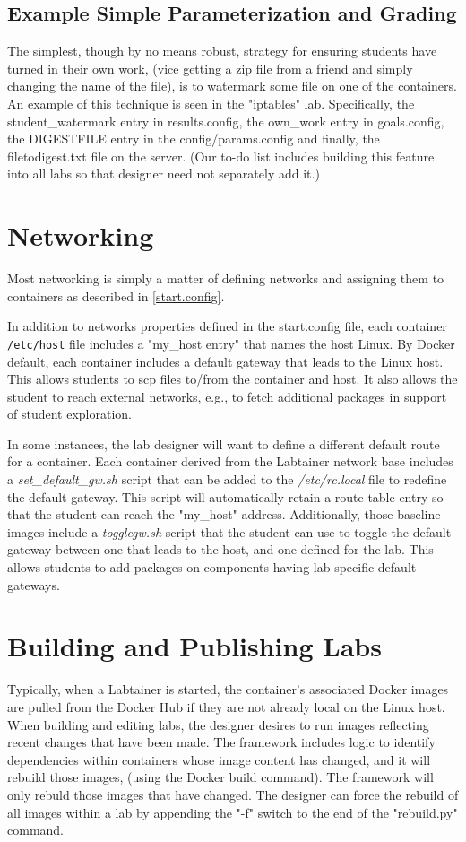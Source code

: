 \documentclass[12pt]{article}
\begin{document}
\subsection{Example Simple Parameterization and Grading}
The simplest, though by no means robust, strategy for ensuring students
have turned in their own work, (vice getting a zip file from a friend and simply
changing the name of the file), is to watermark some file on one of the containers.
An example of this technique is seen in the "iptables" lab.  Specifically, the
student\_watermark entry in results.config, the own\_work entry in goals.config,
the DIGESTFILE entry in the config/params.config and finally, the filetodigest.txt
file on the server.  (Our to-do list includes building this feature into all labs
so that designer need not separately add it.)

\section{Networking}
Most networking is simply a matter of defining networks and assigning them to containers
as described in \ref{start.config}.  

In addition to networks properties defined in the
start.config file, each container \texttt{/etc/host} file includes a "my\_host entry" that names
the host Linux.  By Docker default, each container includes a default gateway that
leads to the Linux host.  This allows students to scp files to/from the container and host.
It also allows the student to reach external networks, e.g., to fetch additional packages in
support of student exploration.

In some instances, the lab designer will want to define a different default route for a 
container.  Each container derived from the Labtainer network base includes a \textit{set\_default\_gw.sh}
script that can be added to the \textit{/etc/rc.local} file to redefine the default gateway.
This script will automatically retain a route table entry so that the student can reach the "my\_host"
address.  Additionally, those baseline images include a \textit{togglegw.sh} script that the student
can use to toggle the default gateway between one that leads to the host, and one defined for the lab.
This allows students to add packages on components having lab-specific default gateways.

\section{Building and Publishing Labs} \label{publishing}
Typically, when a Labtainer is started, the container's associated Docker images are pulled from
the Docker Hub if they are not already local on the Linux host.  When building and editing labs,
the designer desires to run images reflecting recent changes that have been made.  The framework
includes logic to identify dependencies within containers whose image content has changed, 
and it will rebuild those images, (using the Docker build command).  The framework will only 
rebuld those images that have changed.  The designer can force the rebuild of all images within
a lab by appending the "-f" switch to the end of the "rebuild.py" command.
\end{document}
